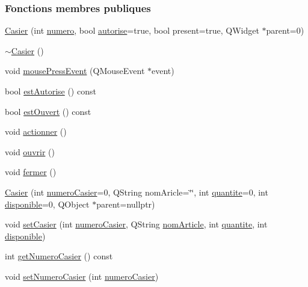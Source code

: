 \subsubsection*{Fonctions membres publiques}
\begin{DoxyCompactItemize}
\item 
\hyperlink{class_casier_a27c0b818ceacb180d031f24d57033d62}{Casier} (int \hyperlink{class_casier_a17aa23e73b177559266a9fb17f63b812}{numero}, bool \hyperlink{class_casier_a2dd9fbe4a93685080a9b5c8f69e3f29a}{autorise}=true, bool present=true, Q\+Widget $\ast$parent=0)
\item 
\hyperlink{class_casier_a4aebc2219ccd4612cf79413904bb9340}{$\sim$\+Casier} ()
\item 
void \hyperlink{class_casier_ad12cf89b6a99254f529997003adcf029}{mouse\+Press\+Event} (Q\+Mouse\+Event $\ast$event)
\item 
bool \hyperlink{class_casier_adc6f3502e2bc9bdafed9634f649b285c}{est\+Autorise} () const
\item 
bool \hyperlink{class_casier_ab26fd4da845423355835da8d445ed5dd}{est\+Ouvert} () const
\item 
void \hyperlink{class_casier_a9182fdde9d86e8f67e4d96ca3dad5eaa}{actionner} ()
\item 
void \hyperlink{class_casier_ac4b0de3ba58dc2bab52b049b278f4f90}{ouvrir} ()
\item 
void \hyperlink{class_casier_a4a6051d72548b83d4b2dfaf189ae6c72}{fermer} ()
\item 
\hyperlink{class_casier_ab3acee2d1166d5daebd7d9d0f637adce}{Casier} (int \hyperlink{class_casier_abc4e6c9bde55c9b703ea53d85b6b1219}{numero\+Casier}=0, Q\+String nom\+Aricle=\char`\"{}\char`\"{}, int \hyperlink{class_casier_acf950b0ab2ee437a9dbc8c6b66432b4c}{quantite}=0, int \hyperlink{class_casier_a5bf1314910ade36747faffdd891d94e9}{disponible}=0, Q\+Object $\ast$parent=nullptr)
\item 
void \hyperlink{class_casier_a140dc38c9e87815b2ce7fc6dce33080b}{set\+Casier} (int \hyperlink{class_casier_abc4e6c9bde55c9b703ea53d85b6b1219}{numero\+Casier}, Q\+String \hyperlink{class_casier_a9632bfa0e94a522bab9da1c3834eaf5a}{nom\+Article}, int \hyperlink{class_casier_acf950b0ab2ee437a9dbc8c6b66432b4c}{quantite}, int \hyperlink{class_casier_a5bf1314910ade36747faffdd891d94e9}{disponible})
\item 
int \hyperlink{class_casier_a77004d988048cf4c8ad521800745be73}{get\+Numero\+Casier} () const
\item 
void \hyperlink{class_casier_a5ae4ea249ab63e1ad44af87fb019a6b0}{set\+Numero\+Casier} (int \hyperlink{class_casier_abc4e6c9bde55c9b703ea53d85b6b1219}{numero\+Casier})

\end{DoxyCompactItemize}
